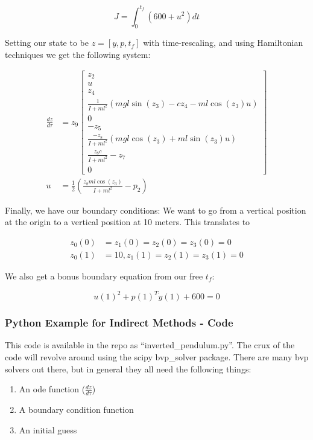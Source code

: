 \documentclass[twoside]{article}
\begin{document}
\[J = \int_0^{t_f} (600 + u^2 )dt \]

Setting our state to be $z = [y,p,t_f]$ with time-rescaling, and using Hamiltonian techniques we get the following system:

\begin{align*}
    \frac{dz}{d\tau} &= z_9\begin{bmatrix}
        z_2 \\ u \\ z_4 \\
        \frac{1}{I+ml^2}(mgl\sin(z_3) - cz_4-ml\cos(z_3)u) \\
        0 \\ -z_5 \\ \frac{-z_8}{I+ml^2}(mgl\cos(z_3) + ml\sin(z_3)u) \\ \frac{z_8c}{I+ml^2}-z_7 \\ 0
    \end{bmatrix} \\
    u &= \frac{1}{2}(\frac{z_8ml\cos(z_3)}{I+ml^2}-p_2)
\end{align*}

Finally, we have our boundary conditions: We want to go from a vertical position at the origin to a vertical position at 10 meters. This translates to

\begin{align*}
    z_0(0) &= z_1(0) = z_2(0) = z_3(0) = 0 \\
    z_0(1) &= 10, z_1(1) = z_2(1) = z_3(1) = 0
\end{align*}

We also get a bonus boundary equation from our free $t_f$:

\[u(1)^2 + p(1)^T\dot{y}(1) + 600 = 0\]

\subsubsection{Python Example for Indirect Methods - Code}
This code is available in the repo as ``inverted\_pendulum.py''. The crux of the code will revolve around using the scipy bvp\_solver package. There are many bvp solvers out there, but in general they all need the following things:

\begin{enumerate}
    \item An ode function ($\frac{dz}{d\tau}$)
    \item A boundary condition function
    \item An initial guess
\end{enumerate}
\end{document}
